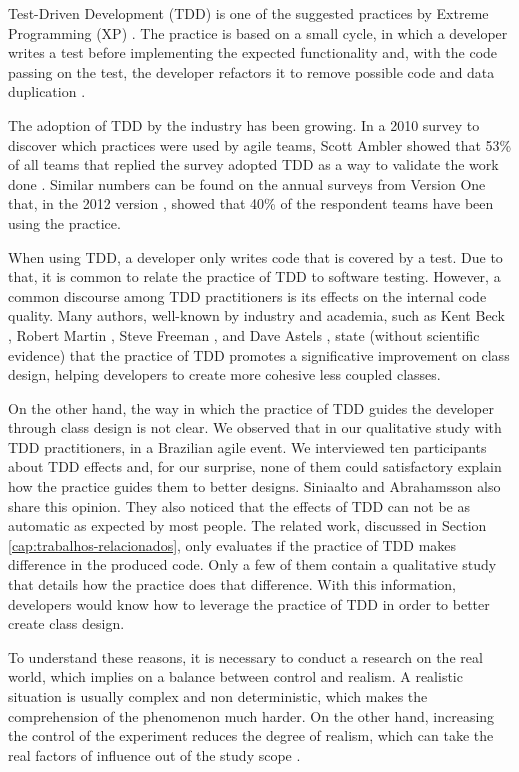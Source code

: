 \documentclass[times]{speauth}
\begin{document}
Test-Driven Development (TDD) is one of the suggested practices
by Extreme Programming (XP) \cite{XPExplained}. The practice is based on
a small cycle, in which a developer writes a test before implementing
the expected functionality and, with the code passing on the
test, the developer refactors it to remove possible code 
and data duplication \cite{TDDByExample}.

The adoption of TDD by the industry has been growing. In a 2010 survey to discover
which practices were used by agile teams, Scott Ambler showed that 53\% of all teams
that replied the survey adopted TDD as a way to validate the work done
\cite{wambler-survey-agile}. Similar numbers can be found on the annual surveys from
Version One that, in the 2012 version \cite{versionone-2012}, showed that
40\% of the respondent teams have been using the practice.

When using TDD, a developer only writes code that is covered by a test. Due
to that, it is common to relate the practice of TDD to software testing. However,
a common discourse among TDD practitioners is its effects on the internal code quality.
Many authors, well-known by industry and academia, such as Kent Beck \cite{TDDByExample}, 
Robert Martin \cite{agile-ppp}, Steve Freeman \cite{GOOS}, and Dave Astels \cite{astels-tdd}, 
state (without scientific evidence) that the practice of TDD promotes a significative
improvement on class design, helping developers to create more cohesive less coupled
classes.

On the other hand, the way in which the practice of TDD guides the developer
through class design is not clear. We observed that in our qualitative study
with TDD practitioners, in a Brazilian agile event. We interviewed
ten participants about TDD effects \cite{aniche-wbma} and, for our surprise,
none of them could satisfactory explain how the practice guides them to better
designs.
Siniaalto and Abrahamsson \cite{alarming-results} also share this opinion. They also
noticed that the effects of TDD can not be as automatic as expected by most people.
The related work, discussed in Section \ref{cap:trabalhos-relacionados},
only evaluates if the practice of TDD makes difference in the produced code. Only a few
of them contain a qualitative study that details how the practice does that difference.
With this information, developers would know how to leverage the practice of TDD in order to 
better create class design.

To understand these reasons, it is necessary to conduct a research on the real world, which
implies on a balance between control and realism. A realistic situation is usually
complex and non deterministic, which makes the comprehension of the phenomenon much
harder. On the other hand, increasing the control of the experiment reduces the
degree of realism, which can take the real factors of influence out of the study
scope \cite{guidelines-case-study}.
\end{document}
